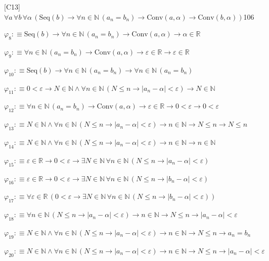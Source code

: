 \begin{fullproof}{[C13]}{$\forall a\,\forall b\,\forall \alpha\,(\mathrm{Seq}(b) \to \forall n \in \mathbb{N}\,(a_{n} = b_{n}) \to \mathrm{Conv}(a,\alpha) \to \mathrm{Conv}(b,\alpha))$}{106}
\begin{abbrevlist}
\item $\varphi_{8} :\equiv \mathrm{Seq}(b) \to \forall n \in \mathbb{N}\,(a_{n} = b_{n}) \to \mathrm{Conv}(a,\alpha) \to \alpha \in \mathbb{R}$
\item $\varphi_{9} :\equiv \forall n \in \mathbb{N}\,(a_{n} = b_{n}) \to \mathrm{Conv}(a,\alpha) \to \varepsilon \in \mathbb{R} \to \varepsilon \in \mathbb{R}$
\item $\varphi_{10} :\equiv \mathrm{Seq}(b) \to \forall n \in \mathbb{N}\,(a_{n} = b_{n}) \to \forall n \in \mathbb{N}\,(a_{n} = b_{n})$
\item $\varphi_{11} :\equiv 0 < \varepsilon \to N \in \mathbb{N} \land \forall n \in \mathbb{N}\,(N \leq n \to \lvert a_{n} - \alpha \rvert < \varepsilon) \to N \in \mathbb{N}$
\item $\varphi_{12} :\equiv \forall n \in \mathbb{N}\,(a_{n} = b_{n}) \to \mathrm{Conv}(a,\alpha) \to \varepsilon \in \mathbb{R} \to 0 < \varepsilon \to 0 < \varepsilon$
\item $\varphi_{13} :\equiv N \in \mathbb{N} \land \forall n \in \mathbb{N}\,(N \leq n \to \lvert a_{n} - \alpha \rvert < \varepsilon) \to n \in \mathbb{N} \to N \leq n \to N \leq n$
\item $\varphi_{14} :\equiv N \in \mathbb{N} \land \forall n \in \mathbb{N}\,(N \leq n \to \lvert a_{n} - \alpha \rvert < \varepsilon) \to n \in \mathbb{N} \to n \in \mathbb{N}$
\item $\varphi_{15} :\equiv \varepsilon \in \mathbb{R} \to 0 < \varepsilon \to \exists N \in \mathbb{N}\,\forall n \in \mathbb{N}\,(N \leq n \to \lvert a_{n} - \alpha \rvert < \varepsilon)$
\item $\varphi_{16} :\equiv \varepsilon \in \mathbb{R} \to 0 < \varepsilon \to \exists N \in \mathbb{N}\,\forall n \in \mathbb{N}\,(N \leq n \to \lvert b_{n} - \alpha \rvert < \varepsilon)$
\item $\varphi_{17} :\equiv \forall \varepsilon \in \mathbb{R}\,(0 < \varepsilon \to \exists N \in \mathbb{N}\,\forall n \in \mathbb{N}\,(N \leq n \to \lvert b_{n} - \alpha \rvert < \varepsilon))$
\item $\varphi_{18} :\equiv \forall n \in \mathbb{N}\,(N \leq n \to \lvert a_{n} - \alpha \rvert < \varepsilon) \to n \in \mathbb{N} \to N \leq n \to \lvert a_{n} - \alpha \rvert < \varepsilon$
\item $\varphi_{19} :\equiv N \in \mathbb{N} \land \forall n \in \mathbb{N}\,(N \leq n \to \lvert a_{n} - \alpha \rvert < \varepsilon) \to n \in \mathbb{N} \to N \leq n \to a_{n} = b_{n}$
\item $\varphi_{20} :\equiv N \in \mathbb{N} \land \forall n \in \mathbb{N}\,(N \leq n \to \lvert a_{n} - \alpha \rvert < \varepsilon) \to n \in \mathbb{N} \to N \leq n \to \lvert a_{n} - \alpha \rvert < \varepsilon$

\end{abbrevlist}
\end{fullproof}
